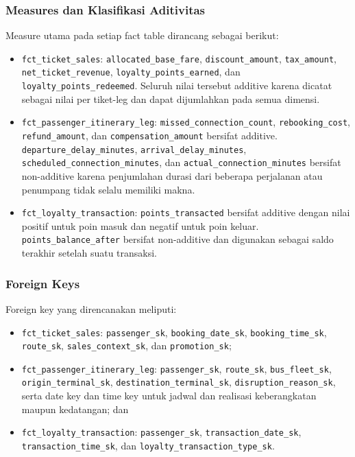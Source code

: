 \subsubsection{Measures dan Klasifikasi Aditivitas}

Measure utama pada setiap fact table dirancang sebagai berikut:

\begin{itemize}[leftmargin=*, topsep=0pt]
    \item \texttt{fct\_ticket\_sales}: \texttt{allocated\_base\_fare},
    \texttt{discount\_amount}, \texttt{tax\_amount},
    \texttt{net\_ticket\_revenue}, \texttt{loyalty\_points\_earned}, dan
    \texttt{loyalty\_points\_redeemed}. Seluruh nilai tersebut additive karena
    dicatat sebagai nilai per tiket-leg dan dapat dijumlahkan pada semua dimensi.
    \item \texttt{fct\_passenger\_itinerary\_leg}:
    \texttt{missed\_connection\_count}, \texttt{rebooking\_cost},
    \texttt{refund\_amount}, dan \texttt{compensation\_amount} bersifat additive.
    \texttt{departure\_delay\_minutes}, \texttt{arrival\_delay\_minutes},
    \texttt{scheduled\_connection\_minutes}, dan
    \texttt{actual\_connection\_minutes} bersifat non-additive karena penjumlahan
    durasi dari beberapa perjalanan atau penumpang tidak selalu memiliki makna.
    \item \texttt{fct\_loyalty\_transaction}: \texttt{points\_transacted} bersifat
    additive dengan nilai positif untuk poin masuk dan negatif untuk poin keluar.
    \texttt{points\_balance\_after} bersifat non-additive dan digunakan sebagai
    saldo terakhir setelah suatu transaksi.
\end{itemize}

\subsubsection{Foreign Keys}

Foreign key yang direncanakan meliputi:

\begin{itemize}[leftmargin=*, topsep=0pt]
    \item \texttt{fct\_ticket\_sales}: \texttt{passenger\_sk},
    \texttt{booking\_date\_sk}, \texttt{booking\_time\_sk},
    \texttt{route\_sk}, \texttt{sales\_context\_sk}, dan
    \texttt{promotion\_sk};
    \item \texttt{fct\_passenger\_itinerary\_leg}: \texttt{passenger\_sk},
    \texttt{route\_sk}, \texttt{bus\_fleet\_sk},
    \texttt{origin\_terminal\_sk}, \texttt{destination\_terminal\_sk},
    \texttt{disruption\_reason\_sk}, serta date key dan time key untuk jadwal dan
    realisasi keberangkatan maupun kedatangan; dan
    \item \texttt{fct\_loyalty\_transaction}: \texttt{passenger\_sk},
    \texttt{transaction\_date\_sk}, \texttt{transaction\_time\_sk}, dan
    \texttt{loyalty\_transaction\_type\_sk}.
\end{itemize}

